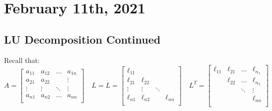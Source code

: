 \documentclass[../main/main.tex]{subfiles}
\begin{document}
\section{February 11th, 2021}
\subsection{LU Decomposition Continued}
Recall that: \[
      A=
\begin{bmatrix}
a_{11} &a_{12}&\ldots&a_{1n} \\
a_{21} &a_{22}&&\vdots \\
\vdots &\vdots&\ddots& \vdots\\
a_{n1} &a_{n2}&\ldots&a_{nn} \\
\end{bmatrix}
\quad L = L = \begin{bmatrix}
\ell_{11} &&& \\
\ell_{21} &\ell_{22}&& \\
\vdots &\vdots&\ddots& \\
\ell_{n1} &\ell_{n2}&&\ell_{nn} \\
      \end{bmatrix}
      \quad
L^{T} =  \begin{bmatrix}
\ell_{11} &\ell_{21}&\ldots& \ell_{n_1} \\
 &\ell_{22}&\ldots&\ell_{n_2} \\
&&\ddots&\vdots \\
 &&&\ell_{nn} \\
\end{bmatrix}
    \]
\end{document}
